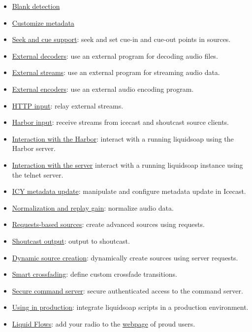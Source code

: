 \begin{itemize}
\item \href{blank.html}{Blank detection}
\item \href{metadata.html}{Customize metadata}
\item \href{seek.html}{Seek and cue support}: seek and set cue-in and cue-out points in sources.
\item \href{external_decoders.html}{External decoders}: use an external program for decoding audio files.
\item \href{external_streams.html}{External streams}: use an external program for streaming audio data.
\item \href{external_encoders.html}{External encoders}: use an external audio encoding program.
\item \href{http_input.html}{HTTP input}: relay external streams.
\item \href{harbor.html}{Harbor input}: receive streams from icecast and shoutcast source clients.
\item \href{harbor_http.html}{Interaction with the Harbor}: interact with a running liquidsoap using the Harbor server.
\item \href{server.html}{Interaction with the server} interact with a running liquidsoap instance using the telnet server.
\item \href{icy_metadata.html}{ICY metadata update}: manipulate and configure metadata update in Icecast.
\item \href{replay_gain.html}{Normalization and replay gain}: normalize audio data.
\item \href{request_sources.html}{Requests-based sources}: create advanced sources using requests.
\item \href{shoutcast.html}{Shoutcast output}: output to shoutcast.
\item \href{dynamic_sources.html}{Dynamic source creation}: dynamically create sources using server requests.
\item \href{smartcrossfade.html}{Smart crossfading}: define custom crossfade transitions.
\item \href{secure_server_access.html}{Secure command server}: secure authenticated access to the command server.
\item \href{in_production.html}{Using in production}: integrate liquidsoap scripts in a production environment.
\item \href{flows.html}{Liquid Flows}: add your radio to the \href{http://savonet.sourceforge.net/flows.html}{webpage} of proud users.

\end{itemize}
